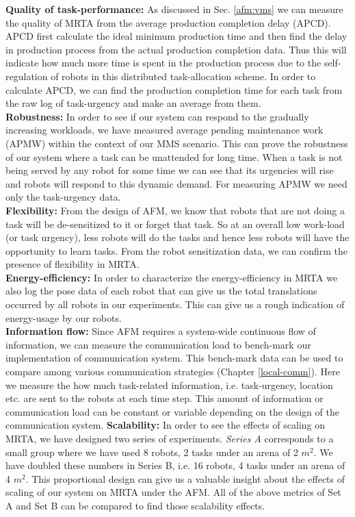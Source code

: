 \textbf{Quality of task-performance:} As discussed in Sec. \ref{afm:vms} we can measure the quality of MRTA from the average production completion delay (APCD). APCD first calculate the ideal minimum production time and then find the delay in production process from the actual production completion data. Thus this will indicate how much more time is  spent in the production process due to the self-regulation of robots in this distributed task-allocation scheme.  In order to calculate APCD, we can find the production completion time for each task from the raw log of task-urgency and make an average from them.\\
\textbf{Robustness:} In order to see if our system can respond to the gradually increasing workloads,  we have measured average pending maintenance work (APMW) within the context of our MMS scenario. This can prove the robustness of our system where a task can be  unattended for long time. When a task is not being served by any robot for some time we can see that its urgencies will rise and robots will respond to this dynamic demand. For measuring APMW we need only the task-urgency data.\\
\textbf{Flexibility:} From the design of AFM, we know that robots that are not doing a task will be de-sensitized to it or forget that task. So at an overall low work-load (or task urgency), less robots will do the tasks and hence less robots will have the opportunity to learn tasks. From the robot sensitization data, we can confirm the presence of flexibility in MRTA.\\
\textbf{Energy-efficiency:} In order to characterize the energy-efficiency in MRTA we also log the pose data of each robot that can give us the total translations occurred by all robots in our experiments. This can give us a rough indication of energy-usage by our robots. \\
\textbf{Information flow:} Since AFM requires a system-wide continuous flow of information, we can measure the communication load to bench-mark our implementation of communication system. This bench-mark data can be used to compare among various communication strategies (Chapter \ref{local-comm}). Here we measure the how much task-related information, i.e. task-urgency, location etc. are sent to the robots at each time step. This  amount of information or communication load can be constant or variable depending on the design of the communication system.
\textbf{Scalability:} In order to see the effects of scaling on MRTA, we have designed two series of experiments. {\em Series A} corresponds to a small group where we have used 8 robots, 2 tasks under an arena of 2 $m^2$. We have doubled these numbers in {Series B}, i.e. 16 robots, 4 tasks under an arena of 4 $m^2$. This proportional design can give us a valuable insight about the effects of scaling of our system on MRTA under the AFM. All of the above metrics of Set A and Set B can be compared to find those scalability effects.\\

